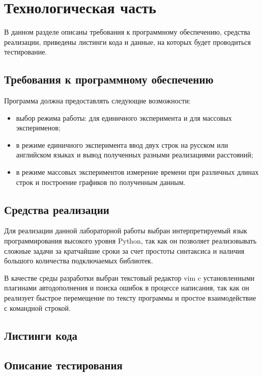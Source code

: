 \chapter{Технологическая часть}

В данном разделе описаны требования к программному обеспечению, средства реализации, приведены листинги кода и данные, на которых будет проводиться тестирование.

\section{Требования к программному обеспечению}

Программа должна предоставлять следующие возможности:
\begin{itemize}[left=\parindent]
    \item выбор режима работы: для единичного эксперимента и для массовых
          эксперименов;
    \item в режиме единичного эксперимента ввод двух строк на русском или
          английском языках и вывод полученных разными реализациями расстояний;
    \item в режиме массовых экспериментов измерение времени при различных
          длинах строк и построение графиков по полученным данным.
\end{itemize}

\section{Средства реализации}


Для реализации данной лабораторной работы выбран интерпретируемый язык
программирования высокого уровня Python, так как он позволяет реализовывать
сложные задачи за кратчайшие сроки за счет простоты синтаксиса и наличия
большого количества подключаемых библиотек. 

В качестве среды разработки выбран текстовый редактор vim c установленными
плагинами автодополнения и поиска ошибок в процессе написания, так как он
реализует быстрое перемещение по тексту программы и простое взаимодействие с
командной строкой.

\section{Листинги кода}

\section{Описание тестирования}

